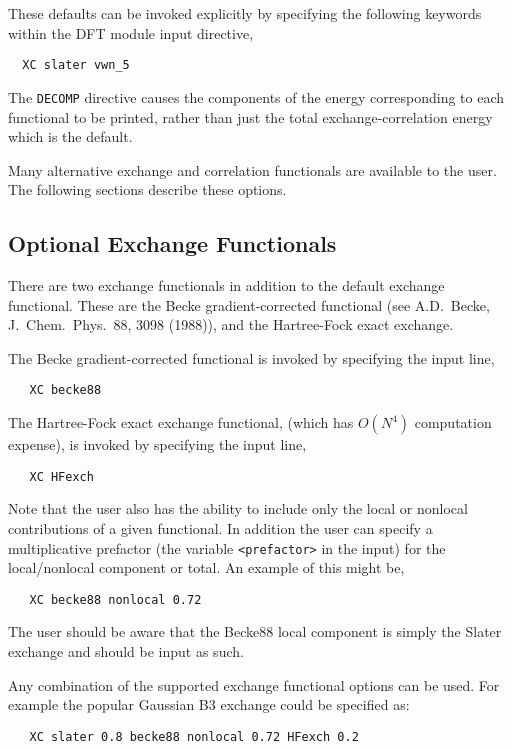 These defaults can be invoked explicitly by specifying the following
keywords within the DFT module input directive,
\begin{verbatim}
  XC slater vwn_5
\end{verbatim}

The \verb+DECOMP+ directive causes the components of the energy
corresponding to each functional to be printed, rather than just the
total exchange-correlation energy which is the default.

Many alternative exchange and correlation functionals are available to
the user.  The following sections describe these options.

\subsection{Optional Exchange Functionals}

There are two exchange functionals in addition to the default exchange
functional.  These are the Becke gradient-corrected functional (see A.D.~Becke, 
J.~Chem.~Phys.~88, 3098 (1988)), and the Hartree-Fock exact exchange.

The Becke gradient-corrected functional is invoked by specifying the input
line,
\begin{verbatim}
   XC becke88
\end{verbatim}

The Hartree-Fock exact exchange functional, (which has $O(N^4)$
computation expense), is invoked by specifying the input line,
\begin{verbatim}
   XC HFexch
\end{verbatim}

Note that the user also has the ability to include only the local or
nonlocal contributions of a given functional.  In addition the user
can specify a multiplicative prefactor (the variable
\verb+<prefactor>+ in the input) for the local/nonlocal component or
total.  An example of this might be,
\begin{verbatim}
   XC becke88 nonlocal 0.72
\end{verbatim}
The user should be aware that the Becke88 local component is simply
the Slater exchange and should be input as such.

Any combination of the supported exchange functional options can be
used.  For example the popular Gaussian B3 exchange could be specified
as:
\begin{verbatim}
   XC slater 0.8 becke88 nonlocal 0.72 HFexch 0.2
\end{verbatim}


